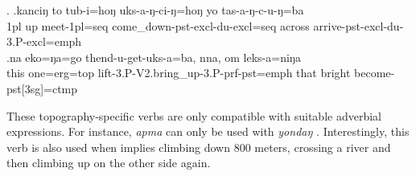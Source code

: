 \ex. \ag.kanciŋ  to  tub-i=hoŋ          uks-a-ŋ-ci-ŋ=hoŋ                       yo      tas-a-ŋ-c-u-ŋ=ba\\
{\sc 1pl} up meet{\sc -1pl=seq} come\_down{\sc -pst-excl-du-excl=seq} across arrive{\sc -pst-excl-du-3.P-excl=emph}\\
 
\bg.na   eko=ŋa=go       thend-u-get-uks-a=ba,     nna, om     leks-a=niŋa\\
this one{\sc =erg=top} lift{\sc -3.P-V2.bring\_up-3.P-prf-pst=emph} that bright become{\sc -pst[3sg]=ctmp}\\
 


These topography-specific verbs are only compatible with suitable adverbial expressions. For instance, \emph{apma}  can only be used with \emph{yondaŋ}  . Interestingly, this verb is also used when  implies climbing down 800 meters, crossing a river and then climbing up on the other side again.

